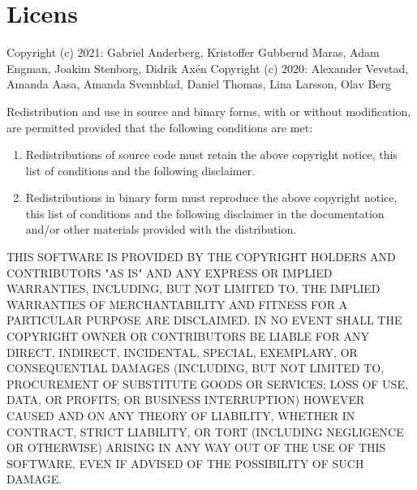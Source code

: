 \section{Licens}
\label{ref:licens}
Copyright (c) 2021: Gabriel Anderberg, Kristoffer Gubberud Maras, Adam Engman, Joakim Stenborg, Didrik Axén \newline \newline
Copyright (c) 2020: Alexander Vevstad, Amanda Aasa, Amanda Svennblad, Daniel Thomas, Lina Larsson, Olav Berg

Redistribution and use in source and binary forms, with or without
modification, are permitted provided that the following conditions are met:

\begin{enumerate}
    \item Redistributions of source code must retain the above copyright notice, this list of conditions and the following disclaimer.
    \item Redistributions in binary form must reproduce the above copyright notice, this list of conditions and the following disclaimer in the documentation and/or other materials provided with the distribution.
\end{enumerate}

THIS SOFTWARE IS PROVIDED BY THE COPYRIGHT HOLDERS AND CONTRIBUTORS "AS IS" AND ANY EXPRESS OR IMPLIED WARRANTIES, INCLUDING,
BUT NOT LIMITED TO, THE IMPLIED WARRANTIES OF MERCHANTABILITY AND FITNESS FOR A PARTICULAR PURPOSE ARE DISCLAIMED. IN NO EVENT
SHALL THE COPYRIGHT OWNER OR CONTRIBUTORS BE LIABLE FOR ANY DIRECT, INDIRECT, INCIDENTAL, SPECIAL, EXEMPLARY, OR CONSEQUENTIAL
DAMAGES (INCLUDING, BUT NOT LIMITED TO, PROCUREMENT OF SUBSTITUTE GOODS OR SERVICES; LOSS OF USE, DATA, OR PROFITS; OR BUSINESS
INTERRUPTION) HOWEVER CAUSED AND ON ANY THEORY OF LIABILITY, WHETHER IN CONTRACT, STRICT LIABILITY, OR TORT (INCLUDING
NEGLIGENCE OR OTHERWISE) ARISING IN ANY WAY OUT OF THE USE OF THIS SOFTWARE, EVEN IF ADVISED OF THE POSSIBILITY OF SUCH DAMAGE.
